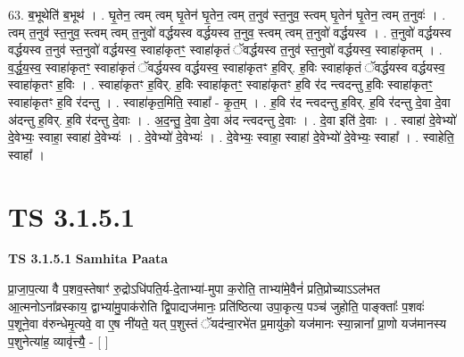 \documentclass[17pt]{extarticle}
\begin{document}
63. ब॒भूथेति॑ ब॒भूथ॑ । . घृ॒तेन॒ त्वम् त्वम् घृ॒तेन॑ घृ॒तेन॒ त्वम् त॒नुव॑ स्त॒नुव॒ स्त्वम् घृ॒तेन॑ घृ॒तेन॒ त्वम् त॒नुवः॑ । . त्वम् त॒नुव॑ स्त॒नुव॒ स्त्वम् त्वम् त॒नुवो॑ वर्द्धयस्व वर्द्धयस्व त॒नुव॒ स्त्वम् त्वम् त॒नुवो॑ वर्द्धयस्व । . त॒नुवो॑ वर्द्धयस्व वर्द्धयस्व त॒नुव॑ स्त॒नुवो॑ वर्द्धयस्व॒ स्वाहा॑कृतꣳ॒॒ स्वाहा॑कृतं ॅवर्द्धयस्व त॒नुव॑ स्त॒नुवो॑ वर्द्धयस्व॒ स्वाहा॑कृतम् । . व॒र्द्ध॒य॒स्व॒ स्वाहा॑कृतꣳ॒॒ स्वाहा॑कृतं ॅवर्द्धयस्व वर्द्धयस्व॒ स्वाहा॑कृतꣳ ह॒विर्. ह॒विः स्वाहा॑कृतं ॅवर्द्धयस्व वर्द्धयस्व॒ स्वाहा॑कृतꣳ ह॒विः । . स्वाहा॑कृतꣳ ह॒विर्. ह॒विः स्वाहा॑कृतꣳ॒॒ स्वाहा॑कृतꣳ ह॒वि र॑द न्त्वदन्तु ह॒विः स्वाहा॑कृतꣳ॒॒ स्वाहा॑कृतꣳ ह॒वि र॑दन्तु । . स्वाहा॑कृत॒मिति॒ स्वाहा᳚ - कृ॒त॒म् । . ह॒वि र॑द न्त्वदन्तु ह॒विर्. ह॒वि र॑दन्तु दे॒वा दे॒वा अ॑दन्तु ह॒विर्. ह॒वि र॑दन्तु दे॒वाः । . अ॒द॒न्तु॒ दे॒वा दे॒वा अ॑द न्त्वदन्तु दे॒वाः । . दे॒वा इति॑ दे॒वाः । . स्वाहा॑ दे॒वेभ्यो॑ दे॒वेभ्यः॒ स्वाहा॒ स्वाहा॑ दे॒वेभ्यः॑ । . दे॒वेभ्यो॑ दे॒वेभ्यः॑ । . दे॒वेभ्यः॒ स्वाहा॒ स्वाहा॑ दे॒वेभ्यो॑ दे॒वेभ्यः॒ स्वाहा᳚ । . स्वाहेति॒ स्वाहा᳚ । \newline
\pagebreak
{}

\section{ TS 3.1.5.1 }

\textbf{TS 3.1.5.1 } \newline
\textbf{Samhita Paata} \newline

प्रा॒जा॒प॒त्या वै प॒शव॒स्तेषाꣳ॑ रु॒द्रोऽधि॑पति॒र्य-दे॒ताभ्या॑-मुपा क॒रोति॒ ताभ्या॑मे॒वैनं॑ प्रति॒प्रोच्याऽऽल॑भत आ॒त्मनोऽना᳚व्रस्काय॒ द्वाभ्या॑मु॒पाक॑रोति द्वि॒पाद्यज॑मानः॒ प्रति॑ष्ठित्या उपा॒कृत्य॒ पञ्च॑ जुहोति॒ पाङ्क्ताः᳚ प॒शवः॑ प॒शूने॒वा व॑रुन्धेमृ॒त्यवे॒ वा ए॒ष नी॑यते॒ यत् प॒शुस्तं ॅयद॑न्वा॒रभे॑त प्र॒मायु॑को॒ यज॑मानः स्या॒न्नाना᳚ प्रा॒णो यज॑मानस्य प॒शुनेत्या॑ह॒ व्यावृ॑त्त्यै॒ - [  ] \newline
\end{document}
